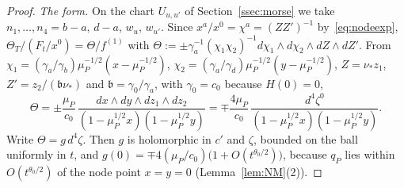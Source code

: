 \begin{proof}
\emph{The form.} On the chart $U_{u,u'}$ of Section~\ref{ssec:morse} we take $n_1,\dots,n_4=b-a,\,d-a,\,w_u,\,w_{u'}$.
Since $x^a/x^0=\chi^a=(ZZ')^{-1}$ by~\eqref{eq:nodeexp}, $\Theta_T/(F_t/x^0)=\Theta/f^{(1)}$ with
$\Theta:=\pm\gamma_a^{-1}(\chi_1\chi_2)^{-1}d\chi_1\wedge d\chi_2\wedge dZ\wedge dZ'$. From
$\chi_1=(\gamma_a/\gamma_b)\mu_P^{-1/2}(x-\mu_P^{-1/2})$, $\chi_2=(\gamma_a/\gamma_d)\mu_P^{-1/2}(y-\mu_P^{-1/2})$,
$Z=\nu_*z_1$, $Z'=z_2/(\mathfrak b\nu_*)$ and $\mathfrak b=\gamma_0/\gamma_a$, with
$\gamma_0=c_0$ because $H(0)=0$,
\[
\Theta=\pm\frac{\mu_P}{c_0}\,\frac{dx\wedge dy\wedge dz_1\wedge dz_2}{(1-\mu_P^{1/2}x)(1-\mu_P^{1/2}y)}
=\mp\frac{4\mu_P}{c_0}\,\frac{d^4\zeta^0}{(1-\mu_P^{1/2}x)(1-\mu_P^{1/2}y)} .
\]
Write $\Theta=g\,d^4\zeta$. Then $g$ is holomorphic in $c'$ and $\zeta$, bounded on the ball uniformly in $t$, and
$g(0)=\mp4(\mu_P/c_0)\bigl(1+O(t^{\theta_0/2})\bigr)$, because $q_P$ lies within $O(t^{\theta_0/2})$ of the node point
$x=y=0$ (Lemma~\ref{lem:NM}(2)).


\end{proof}
